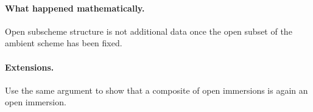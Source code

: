 \paragraph{What happened mathematically.}
Open subscheme structure is not additional data once the open subset of the ambient scheme has been fixed.

\paragraph{Extensions.}
Use the same argument to show that a composite of open immersions is again an open immersion.
\fi
